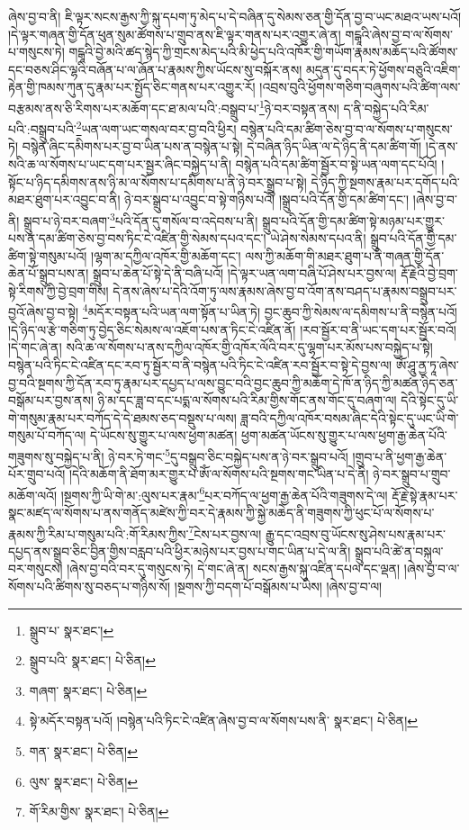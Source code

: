 ཞེས་བྱ་བ་ནི། ཇི་ལྟར་སངས་རྒྱས་ཀྱི་སྐུ་དཔག་ཏུ་མེད་པ་དེ་བཞིན་དུ་སེམས་ཅན་གྱི་དོན་བྱ་བ་ཡང་མཐའ་ཡས་པའོ། །དེ་ལྟར་གཞན་གྱི་དོན་ཕུན་སུམ་ཚོགས་པ་གྲུབ་ནས་ཇི་ལྟར་གནས་པར་འགྱུར་ཞེ་ན། གངྒཱའི་ཞེས་བྱ་བ་ལ་སོགས་པ་གསུངས་ཏེ། གངྒཱའི་བྱེ་མའི་ཚད་སྙེད་ཀྱི་གྲངས་མེད་པའི་མི་ཕྱེད་པའི་འཁོར་གྱི་གཡོག་རྣམས་མཆོད་པའི་ཚོགས་དང་བཅས་ཤིང་ལྷའི་བཞོན་པ་ལ་ཞོན་པ་རྣམས་ཀྱིས་ཡོངས་སུ་བསྐོར་ནས། མདུན་དུ་བདར་ཏེ་ཕྱོགས་བཅུའི་འཇིག་རྟེན་གྱི་ཁམས་ཀུན་དུ་རྣམ་པར་སྤྱོད་ཅིང་གནས་པར་འགྱུར་རོ། །འབྲས་བུའི་ཕྱོགས་གཅིག་བཞུགས་པའི་ཚིག་ལས་བརྩམས་ནས་ཅི་རིགས་པར་མཆོག་དང་ཐ་མལ་པའི་:བསྒྲུབ་པ་\footnote{སྒྲུབ་པ་  སྣར་ཐང་། }ཉེ་བར་བསྟན་ནས། ད་ནི་བསྐྱེད་པའི་རིམ་པའི་:བསྒྲུབ་པའི་\footnote{སྒྲུབ་པའི་  སྣར་ཐང་།  པེ་ཅིན། }ཡན་ལག་ཡང་གསལ་བར་བྱ་བའི་ཕྱིར། བསྙེན་པའི་དམ་ཚིག་ཅེས་བྱ་བ་ལ་སོགས་པ་གསུངས་ཏེ། བསྙེན་ཞིང་དམིགས་པར་བྱ་བ་ཡིན་པས་ན་བསྙེན་པ་སྟེ། དེ་བཞིན་ཉིད་ཡིན་ལ་དེ་ཉིད་ནི་དམ་ཚིག་གོ། །དེ་ནས་སའི་ཆ་ལ་སོགས་པ་ཡང་དག་པར་སྦྱར་ཞིང་བསྐྱེད་པ་ནི། བསྙེན་པའི་དམ་ཚིག་སྦྱོར་བ་སྟེ་ཡན་ལག་དང་པོའོ། །སྟོང་པ་ཉིད་དམིགས་ནས་ཉི་མ་ལ་སོགས་པ་དམིགས་པ་ནི་ཉེ་བར་སྒྲུབ་པ་སྟེ། དེ་ཉིད་ཀྱི་སྔགས་རྣམ་པར་དགོད་པའི་མཐར་ཐུག་པར་འབྱུང་བ་ནི། ཉེ་བར་སྒྲུབ་པ་འབྱུང་བ་སྟེ་གཉིས་པའོ། །སྒྲུབ་པའི་དོན་གྱི་དམ་ཚིག་དང་། །ཞེས་བྱ་བ་ནི། སྒྲུབ་པ་ཉེ་བར་བཞག་\footnote{གཞག་  སྣར་ཐང་།  པེ་ཅིན། }པའི་དོན་དུ་གསོལ་བ་འདེབས་པ་ནི། སྒྲུབ་པའི་དོན་གྱི་དམ་ཚིག་སྟེ་མཉམ་པར་གྱུར་པས་ན་དམ་ཚིག་ཅེས་བྱ་བས་ཏིང་ངེ་འཛིན་གྱི་སེམས་དཔའ་དང་། ཡེ་ཤེས་སེམས་དཔའ་ནི། སྒྲུབ་པའི་དོན་གྱི་དམ་ཚིག་སྟེ་གསུམ་པའོ། །ལྷག་མ་དཀྱིལ་འཁོར་གྱི་མཆོག་དང་། ལས་ཀྱི་མཆོག་གི་མཐར་ཐུག་པ་ནི་གཞན་གྱི་དོན་ཆེན་པོ་སྒྲུབ་པས་ན། སྒྲུབ་པ་ཆེན་པོ་སྟེ་དེ་ནི་བཞི་པའོ། །དེ་ལྟར་ཡན་ལག་བཞི་པོ་ཤེས་པར་བྱས་ལ། རྡོ་རྗེའི་བྱེ་བྲག་སྟེ་རིགས་ཀྱི་བྱེ་བྲག་གིས། དེ་ནས་ཞེས་པ་དེའི་འོག་ཏུ་ལས་རྣམས་ཞེས་བྱ་བ་འོག་ནས་བཤད་པ་རྣམས་བསྒྲུབ་པར་བྱའོ་ཞེས་བྱ་བ་སྟེ། \footnote{སྟེ་མདོར་བསྟན་པའོ། །བསྙེན་པའི་ཏིང་ངེ་འཛིན་ཞེས་བྱ་བ་ལ་སོགས་པས་ནི་  སྣར་ཐང་།  པེ་ཅིན། }མདོར་བསྟན་པའི་ཡན་ལག་སྟོན་པ་ཡིན་ཏེ། བྱང་ཆུབ་ཀྱི་སེམས་ལ་དམིགས་པ་ནི་བསྙེན་པའོ། །དེ་ཉིད་ལ་རྩེ་གཅིག་ཏུ་བྱེད་ཅིང་སེམས་ལ་འཇོག་པས་ན་ཏིང་ངེ་འཛིན་ནོ། །རབ་སྦྱོར་བ་ནི་ཡང་དག་པར་སྦྱོར་བའོ། །དེ་གང་ཞེ་ན། སའི་ཆ་ལ་སོགས་པ་ནས་དཀྱིལ་འཁོར་གྱི་འཁོར་ལོའི་བར་དུ་ལྷག་པར་མོས་པས་བསྐྱེད་པ་སྟེ། བསྙེན་པའི་ཏིང་ངེ་འཛིན་དང་རབ་ཏུ་སྦྱོར་བ་ནི་བསྙེན་པའི་ཏིང་ངེ་འཛིན་རབ་སྦྱོར་བ་སྟེ་དེ་བྱས་ལ། ཨོཾ་ཤཱུ་ནྱ་ཏཱ་ཞེས་བྱ་བའི་སྔགས་ཀྱི་དོན་རབ་ཏུ་རྣམ་པར་དཔྱད་པ་ལས་བྱུང་བའི་བྱང་ཆུབ་ཀྱི་མཆོག་དེ་ཁོ་ན་ཉིད་ཀྱི་མཚན་ཉིད་ཅན་བསྒོམ་པར་བྱས་ནས། ཉི་མ་དང་ཟླ་བ་དང་པདྨ་ལ་སོགས་པའི་རིམ་གྱིས་གོང་ནས་གོང་དུ་བཞག་ལ། དེའི་སྟེང་དུ་ཡི་གེ་གསུམ་རྣམ་པར་བཀོད་དེ་དེ་ཐམས་ཅད་བསྡུས་པ་ལས། ཟླ་བའི་དཀྱིལ་འཁོར་བསམ་ཞིང་དེའི་སྟེང་དུ་ཡང་ཡི་གེ་གསུམ་པོ་བཀོད་ལ། དེ་ཡོངས་སུ་གྱུར་པ་ལས་ཕྱག་མཚན། ཕྱག་མཚན་ཡོངས་སུ་གྱུར་པ་ལས་ཕྱག་རྒྱ་ཆེན་པོའི་གཟུགས་སུ་བསྐྱེད་པ་ནི། ཉེ་བར་ཏེ་གང་\footnote{གན་  སྣར་ཐང་།  པེ་ཅིན། }དུ་བསྒྲུབ་ཅིང་བསྐྱེད་པས་ན་ཉེ་བར་སྒྲུབ་པའོ། །གྲུབ་པ་ནི་ཕྱག་རྒྱ་ཆེན་པོར་གྲུབ་པའོ། །དེའི་མཆོག་ནི་ཐོག་མར་གྱུར་པ་ཨོཾ་ལ་སོགས་པའི་སྔགས་གང་ཡིན་པ་དེ་ནི། ཉེ་བར་སྒྲུབ་པ་གྲུབ་མཆོག་ལའོ། །སྔགས་ཀྱི་ཡི་གེ་མ་:ལུས་པར་རྣམ་\footnote{ལུས་  སྣར་ཐང་།  པེ་ཅིན། }པར་བཀོད་ལ་ཕྱག་རྒྱ་ཆེན་པོའི་གཟུགས་དེ་ལ། རྡོ་རྗེ་སྟེ་རྣམ་པར་སྣང་མཛད་ལ་སོགས་པ་ནས་གནོད་མཛེས་ཀྱི་བར་དེ་རྣམས་ཀྱི་སྐྱེ་མཆེད་ནི་གཟུགས་ཀྱི་ཕུང་པོ་ལ་སོགས་པ་རྣམས་ཀྱི་རིམ་པ་གསུམ་པའི་:གོ་རིམས་ཀྱིས་\footnote{གོ་རིམ་གྱིས་  སྣར་ཐང་།  པེ་ཅིན། }ངེས་པར་བྱས་ལ། རྒྱུ་དང་འབྲས་བུ་ཡོངས་སུ་ཤེས་པས་རྣམ་པར་དཔྱད་ནས་སྒྲུབ་ཅིང་བྱིན་གྱིས་བརླབ་པའི་ཕྱིར་མཉེས་པར་བྱས་པ་གང་ཡིན་པ་དེ་ལ་ནི། སྒྲུབ་པའི་ཚེ་ན་བསྐུལ་བར་གསུངས། །ཞེས་བྱ་བའི་བར་དུ་གསུངས་ཏེ། དེ་གང་ཞེ་ན། སངས་རྒྱས་སྐུ་འཛིན་དཔལ་དང་ལྡན། །ཞེས་བྱ་བ་ལ་སོགས་པའི་ཚིགས་སུ་བཅད་པ་གཉིས་སོ། །སྔགས་ཀྱི་བདག་པོ་བསྒོམས་པ་ཡིས། །ཞེས་བྱ་བ་ལ། 